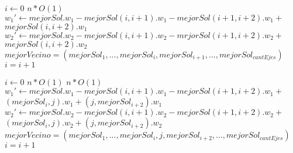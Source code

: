 \begin{flushleft}
 \begin{figure}[H]
  \begin{pseudo}
   \State $i \leftarrow 0$
   \hfill$n*O(1)$
	  \State $w_1' \leftarrow mejorSol.w_1 - mejorSol(i,i+1).w_1 - mejorSol(i+1,i+2).w_1 + $
	  \State$mejorSol(i,i+2).w_1$
	  \State $w_2' \leftarrow mejorSol.w_2 - mejorSol(i,i+1).w_2 - mrjorSol(i+1,i+2).w_2 + $
	  \State $mejorSol(i,i+2).w_2$
	    \State $mejorVecino = (mejorSol_1, ... ,mejorSol_i, mejorSol_{i+1}, ..., mejorSol_{cantEjes})$
	  \EndIf
      \EndIf
      \State $i = i+1$
   \EndWhile
   \EndProcedure
  \end{pseudo}
 \end{figure}
\end{flushleft}

\begin{flushleft}
 \begin{figure}[H]
  \begin{pseudo}
   \State $i \leftarrow 0$
   \hfill$n*O(1)$
      \hfill$n*O(1)$
	  \State $w_1' \leftarrow mejorSol.w_1 - mejorSol(i,i+1).w_1 - mejorSol(i+1,i+2).w_1 + $
	  \State $(mejorSol_i, j).w_1 + (j, mejorSol_{i+2}).w_1$
	  \State $w_2' \leftarrow mejorSol.w_2 - mejorSol(i,i+1).w_2 - mejorSol(i+1,i+2).w_2 + $
	  \State $(mejorSol_i, j).w_2 + (j, mejorSol_{i+2}).w_2$
	    \State $mejorVecino = (mejorSol_1, ... ,mejorSol_i, j ,mejorSol_{i+2}, ..., mejorSol_{cantEjes})$
	  \EndIf
      \EndFor
      \State $i = i+1$
   \EndWhile
   \EndProcedure
  \end{pseudo}
 \end{figure}
\end{flushleft}

